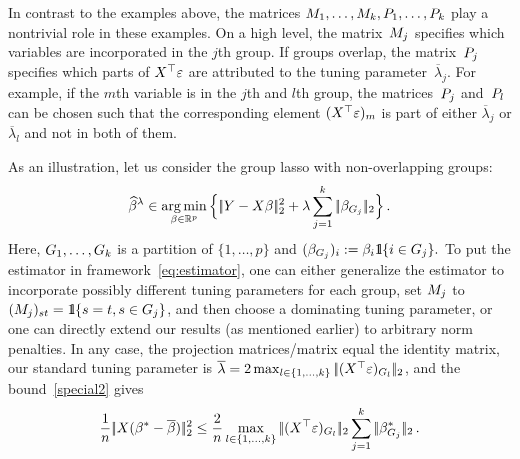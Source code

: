 \documentclass[bj]{imsart}
\newcommand{\normtwo}[1]{\ensuremath{\!|\!| #1 | \! |_{2}}}
\newcommand{\1}{{\rm 1}\mskip -4,5mu{\rm l} }
\newcommand{\argmin}{\mathop{\mathrm{arg\,min}}}
\newcommand{\rp}{\mathbb{R}^p}
\newcommand{\betatrue}{\beta^*}
\newcommand{\lo}{\overline{\lambda}}
\begin{document}
In contrast to the examples above, the matrices $M_{1},\dots,M_{k},P_1,\dots,P_{k}$ play a nontrivial role in these examples. On a high level, the matrix~$M_{j}$ specifies which variables are incorporated in the $j$th group. If groups overlap, the matrix~$P_j$ specifies which parts of $\textcolor{black}{X}^\top \textcolor{black}{\varepsilon}$ are attributed to the  tuning parameter~$\lo_j.$ For example, if the $m$th variable is in the $j$th and $l$th group, the matrices~$P_j$ and~$P_l$ can be chosen such that the corresponding element $(\textcolor{black}{X}^\top\textcolor{black}{\varepsilon})_m$ is part of either $\lo_j$ or $\lo_l$ and not in both of them.

As an illustration, let us consider the group lasso with non-overlapping groups:
\begin{equation*}
  \estimatort \in \argmin_{\beta\in\rp}\Big\{\,\normtwo{\outcome-\design\beta}^2+\tuningparameter\sum_{j=1}^\numbergroups\, \normtwo{\beta_{G_j}}\Big\}\,.
\end{equation*}
Here, $G_1,\dots,G_{k}$ is a partition of $\{1,\dots,p\}$ and $(\beta_{G_j})_i:=\beta_i\1\{i\in G_j\}.$ To put the estimator in  framework~\eqref{eq:estimator}, one can either generalize the estimator to incorporate possibly different tuning parameters for each group, set $M_j$ to~$(\fusedmatrix_j)_{st}=\1\{s=t,s\in G_j\}$, and then choose a dominating tuning parameter, or one can directly extend our results (as mentioned earlier) to arbitrary norm penalties. In any case, the projection matrices/matrix equal the identity matrix, our standard tuning parameter  is $\lo=2\max_{l\in\{1,\dots,\numbergroups\}}\,\normtwo{(\design^\top\noise)_{G_l}}$, and the bound~\eqref{special2} gives  
\begin{equation*}
\frac{1}{n}\,\normtwo{\design(\betatrue-\estimatororacle)}^2 \le \frac{2}{n}\max_{l\in\{1,\dots,\numbergroups\}}\,\normtwo{(\design^\top\noise)_{G_l}} \sum_{j=1}^\numbergroups\,\normtwo{\betatrue_{G_j}} \,.
\end{equation*} 
\end{document}
